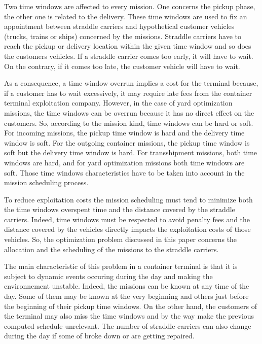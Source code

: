 \documentclass[a4paper,10pt]{article}
\begin{document}
Two time windows are affected to every mission. One concerns the pickup phase, the other one is related to the delivery. These time windows are used to fix an appointment between straddle carriers and hypothetical customer vehicles (trucks, trains or ships) concerned by the missions. Straddle carriers have to reach the pickup or delivery location within the given time window and so does the customers vehicles. If a straddle carrier comes too early, it will have to wait. On the contrary, if it comes too late, the customer vehicle will have to wait.

As a consequence, a time window overrun implies a cost for the terminal because, if a customer has to wait excessively, it may require late fees from the container terminal exploitation company. However, in the case of yard optimization missions, the time windows can be overrun because it has no direct effect on the customers. So, according to the mission kind, time windows can be hard or soft. For incoming missions, the pickup time window is hard and the delivery time window is soft. For the outgoing container missions, the pickup time window is soft but the delivery time window is hard. For transshipment missions, both time windows are hard, and for yard optimization missions both time windows are soft. Those time windows characteristics have to be taken into account in the mission scheduling process\cite{Lesauvage2009}.

To reduce exploitation costs the mission scheduling must tend to minimize both the time windows overspent time and the distance covered by the straddle carriers. Indeed, time windows must be respected to avoid penalty fees and the distance covered by the vehicles directly impacts the exploitation costs of those vehicles. %
So, the optimization problem discussed in this paper concerns the allocation and the scheduling of the missions to the straddle carriers.

The main characteristic of this problem in a container terminal is that it is subject to dynamic events occuring during the day and making the environnement unstable. Indeed, the missions can be known at any time of the day. Some of them may be known at the very beginning and others just before the beginning of their pickup time windows. On the other hand, the customers of the terminal may also miss the time windows and by the way make the previous computed schedule unrelevant. The number of straddle carriers can also change during the day if some of broke down or are getting repaired.
\end{document}
